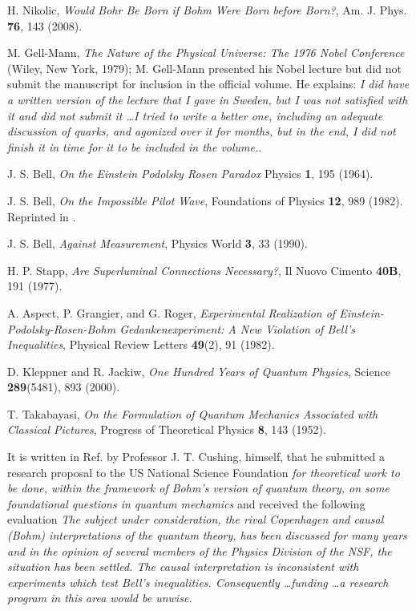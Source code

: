\documentclass[nofootinbib, secnumarabic, amsmath, nobibnotes,11pt,aps,pra, floatfix]{revtex4-1}
\begin{document}
\begin{thebibliography}{999}
H. Nikolic, \emph{Would Bohr Be Born if Bohm Were Born before Born?}, Am. J. Phys. \textbf{76},  143 (2008).

M. Gell-Mann, \emph{The Nature of the Physical Universe: The 1976 Nobel Conference} (Wiley, New York, 1979); M. Gell-Mann presented his Nobel lecture but did not submit the manuscript for inclusion in the official volume. He explains: \textit{I did have a written version of the lecture that I gave in Sweden, but I was not satisfied with it and did not submit it \ldots I tried to write a better one, including an adequate discussion of quarks, and agonized over it for months, but in the end, I did not finish it in time for it to be included in the volume.}.

J. S. Bell, \emph{On the Einstein Podolsky Rosen Paradox} Physics {\bf 1},  195 (1964).

J. S. Bell, \emph{On the Impossible Pilot Wave}, Foundations of Physics \textbf{12},  989 (1982). Reprinted in \cite{om.Bell1987}.

J. S. Bell, \emph{Against Measurement}, Physics World \textbf{3},  33 (1990).

H. P. Stapp, \emph{Are Superluminal Connections Necessary?}, Il Nuovo Cimento \textbf{40B},  191 (1977).

A. Aspect, P. Grangier, and G. Roger, \emph{Experimental Realization of Einstein-Podolsky-Rosen-Bohm Gedankenexperiment: A New Violation of Bell's Inequalities}, Physical Review Letters \textbf{49}(2),  91 (1982).

D. Kleppner and R. Jackiw, \emph{One Hundred Years of Quantum Physics}, Science \textbf{289}(5481),  893 (2000).

T. Takabayasi, \emph{On the Formulation of Quantum Mechanics Associated with Classical Pictures}, Progress of Theoretical Physics \textbf{8},  143 (1952).

It is written in Ref. \cite{om.Bohmian1996} by Professor J. T. Cushing, himself, that he submitted a research proposal to the US National Science Foundation \textit{for theoretical work to be done, within the framework of Bohm's version of quantum theory, on some foundational questions in quantum mechamics} and received the following evaluation \textit{The subject under consideration, the rival Copenhagen and causal (Bohm) interpretations of the quantum theory, has been discussed for many years and in the opinion of several members of the Physics Division of the NSF, the situation has been settled. The causal interpretation is inconsistent with experiments which test Bell's inequalities. Consequently \ldots funding \ldots a research program in this area would be unwise.}


\end{thebibliography}
\end{document}
